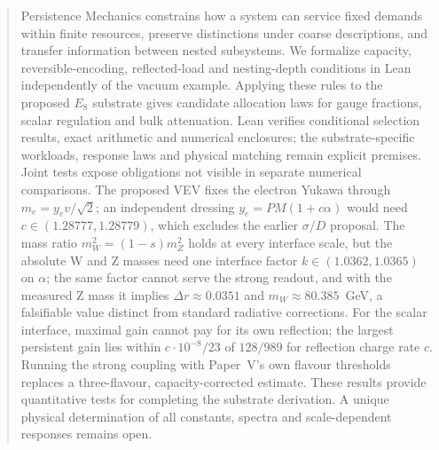 
\begin{abstract}
Persistence Mechanics constrains how a system can service fixed demands within finite resources, preserve distinctions under coarse descriptions, and transfer information between nested subsystems. We formalize capacity, reversible-encoding, reflected-load and nesting-depth conditions in Lean independently of the vacuum example. Applying these rules to the proposed $E_8$ substrate gives candidate allocation laws for gauge fractions, scalar regulation and bulk attenuation. Lean verifies conditional selection results, exact arithmetic and numerical enclosures; the substrate-specific workloads, response laws and physical matching remain explicit premises. Joint tests expose obligations not visible in separate numerical comparisons. The proposed VEV fixes the electron Yukawa through $m_e=y_e v/\sqrt{2}$; an independent dressing $y_e=PM(1+c\alpha)$ would need $c\in(1.28777,1.28779)$, which excludes the earlier $\sigma/D$ proposal. The mass ratio $m_W^2=(1-s)m_Z^2$ holds at every interface scale, but the absolute W and Z masses need one interface factor $k\in(1.0362,1.0365)$ on $\alpha$; the same factor cannot serve the strong readout, and with the measured Z mass it implies $\Delta r\approx0.0351$ and $m_W\approx80.385$~GeV, a falsifiable value distinct from standard radiative corrections. For the scalar interface, maximal gain cannot pay for its own reflection; the largest persistent gain lies within $c\cdot10^{-8}/23$ of $128/989$ for reflection charge rate $c$. Running the strong coupling with Paper~V's own flavour thresholds replaces a three-flavour, capacity-corrected estimate. These results provide quantitative tests for completing the substrate derivation. A unique physical determination of all constants, spectra and scale-dependent responses remains open.
\end{abstract}
